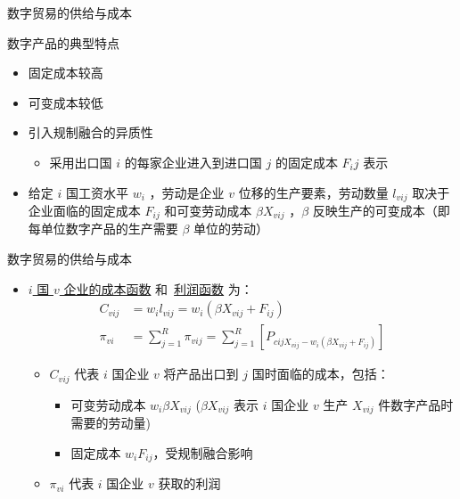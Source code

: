 \documentclass{beamer}
\begin{document}
\begin{frame}{数字贸易的供给与成本}
    \begin{tcolorbox}[colback=lightyellow,colframe=deepblue,coltext=black]
        \begin{large}
            数字产品的典型特点
        \end{large}
        \begin{itemize}
            \item 固定成本较高
            \item 可变成本较低
        \end{itemize}
    \end{tcolorbox}
    \begin{itemize}
        \item 引入规制融合的异质性
        \begin{itemize}
            \item 采用出口国 $i$ 的每家企业进入到进口国 $j$ 的固定成本 $F_ij$ 表示
        \end{itemize}
        \item 给定 $i$ 国工资水平 $w_i$ ，劳动是企业 $v$ 位移的生产要素，劳动数量 $l_{vij}$ 取决于企业面临的固定成本 $F_{ij}$ 和可变劳动成本 $\beta X_{vij}$ ，$\beta$ 反映生产的可变成本（即每单位数字产品的生产需要 $\beta$ 单位的劳动）
    \end{itemize}
\end{frame}

\begin{frame}{数字贸易的供给与成本}
    \begin{itemize}
        \item \underline{$i$ 国 $v$ 企业的成本函数} 和\ \underline{利润函数} 为：
        \begin{align*}
            C_{vij} &= w_i l_{vij} = w_i(\beta X_{vij} + F_{ij}) \tag{5} \\
            \pi_{vi} &= \sum_{j=1}^{R} \pi_{vij} = \sum_{j=1}^{R} [P_{cij X_{vij} - w_i(\beta X_{vij} + F_{ij})}] \tag{6}
        \end{align*}
        \begin{itemize}
            \item $C_{vij}$ 代表 $i$ 国企业 $v$ 将产品出口到 $j$ 国时面临的成本，包括：
            \begin{itemize}
                \item 可变劳动成本 $w_i \beta X_{vij}$ ({$\beta X_{vij}$ 表示 $i$ 国企业 $v$ 生产 $X_{vij}$ 件数字产品时需要的劳动量})
                \item 固定成本 $w_i F_{ij}$，受规制融合影响
            \end{itemize}
            \item $\pi_{vi}$ 代表 $i$ 国企业 $v$ 获取的利润
        \end{itemize}
    \end{itemize}
\end{frame}
\end{document}
